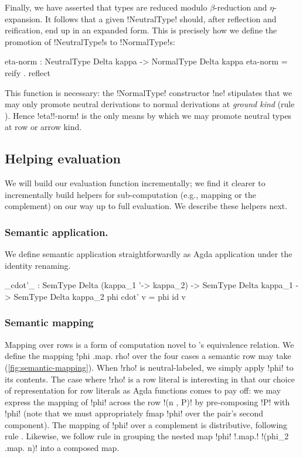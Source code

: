 \documentclass[sigplan,10pt,review]{acmart}\settopmatter{printfolios=true,printccs=false,printacmref=false}
\begin{document}
Finally, we have asserted that types are reduced modulo $\beta$-reduction and $\eta$-expansion. It follows that a given !NeutralType! should, after reflection and reification, end up in an expanded form. This is precisely how we define the promotion of !NeutralType!s to !NormalType!s: 

\begin{agda}
eta-norm : NeutralType Delta kappa -> NormalType Delta kappa
eta-norm = reify . reflect
\end{agda}

This function is necessary: the !NormalType! constructor !ne! stipulates that we may only promote neutral derivations to normal derivations at \emph{ground kind} (rule ). Hence !eta!!-norm! is the only means by which we may promote neutral types at row or arrow kind.

\subsection{Helping evaluation}
\label{sec:helping-evaluation}
We will build our evaluation function incrementally; we find it clearer to incrementally build helpers for sub-computation (e.g., mapping or the complement) on our way up to full evaluation. We describe these helpers next.

\subsubsection{Semantic application.}

We define semantic application straightforwardly as Agda application under the identity renaming.

\begin{agda}
_cdot'_ : SemType Delta (kappa_1 '-> kappa_2) -> 
          SemType Delta kappa_1 -> 
          SemType Delta kappa_2
phi cdot' v = phi id v
\end{agda}

\subsubsection{Semantic mapping}
Mapping over rows is a form of computation novel to \Rome's equivalence relation. We define the mapping !phi .map. rho! over the four cases a semantic row may take (\cref{fig:semantic-mapping}). When !rho! is neutral-labeled, we simply apply !phi! to its contents. The case where !rho! is a row literal is interesting in that our choice of representation for row literals as Agda functions comes to pay off: we may express the mapping of !phi! across the row !(n , P)! by pre-composing !P! with !phi! (note that we must appropriately fmap !phi! over the pair's second component). The mapping of !phi! over a complement is distributive, following rule . Likewise, we follow rule  in grouping the nested map !phi! !.map.! !(phi_2 .map. n)! into a composed map. 
\end{document}

